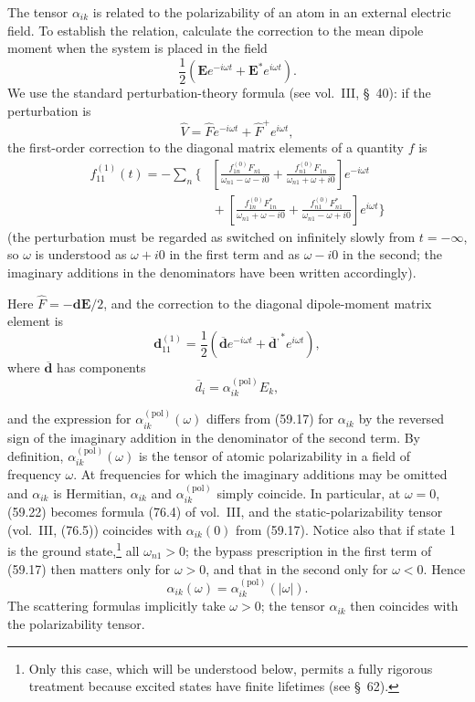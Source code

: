 The tensor $\alpha_{ik}$ is related to the polarizability of an atom in an external electric field. To establish the relation, calculate the correction to the mean dipole moment when the system is placed in the field
\begin{equation}
\frac12\left(\mathbf E e^{-i\omega t}+\mathbf E^*e^{i\omega t}\right).
\tag{59.20}
\end{equation}
We use the standard perturbation-theory formula (see vol.~III, \S~40): if the perturbation is
\[
\widehat V=\widehat F e^{-i\omega t}+\widehat F^+e^{i\omega t},
\]
the first-order correction to the diagonal matrix elements of a quantity $f$ is
\[
\begin{aligned}
f_{11}^{(1)}(t)=-\sum_n\Biggl\{&\left[
\frac{f_{1n}^{(0)}F_{n1}}{\omega_{n1}-\omega-i0}
+\frac{f_{n1}^{(0)}F_{1n}}{\omega_{n1}+\omega+i0}\right]e^{-i\omega t}\\
&{}+\left[
\frac{f_{1n}^{(0)}F_{1n}^*}{\omega_{n1}+\omega-i0}
+\frac{f_{n1}^{(0)}F_{n1}^*}{\omega_{n1}-\omega+i0}\right]e^{i\omega t}\Biggr\}
\end{aligned}
\]
(the perturbation must be regarded as switched on infinitely slowly from $t=-\infty$, so $\omega$ is understood as $\omega+i0$ in the first term and as $\omega-i0$ in the second; the imaginary additions in the denominators have been written accordingly).

Here $\widehat F=-\mathbf d\mathbf E/2$, and the correction to the diagonal dipole-moment matrix element is
\begin{equation}
\mathbf d_{11}^{(1)}=\frac12\left(\overline{\mathbf d}e^{-i\omega t}+\overline{\mathbf d}^{,*}e^{i\omega t}\right),
\tag{59.21}
\end{equation}
where $\overline{\mathbf d}$ has components
\begin{equation}
\overline d_i=\alpha_{ik}^{(\text{pol})}E_k,
\tag{59.22}
\end{equation}

and the expression for $\alpha_{ik}^{(\text{pol})}(\omega)$ differs from (59.17) for $\alpha_{ik}$ by the reversed sign of the imaginary addition in the denominator of the second term. By definition, $\alpha_{ik}^{(\text{pol})}(\omega)$ is the tensor of atomic polarizability in a field of frequency $\omega$. At frequencies for which the imaginary additions may be omitted and $\alpha_{ik}$ is Hermitian, $\alpha_{ik}$ and $\alpha_{ik}^{(\text{pol})}$ simply coincide. In particular, at $\omega=0$, (59.22) becomes formula (76.4) of vol.~III, and the static-polarizability tensor (vol.~III, (76.5)) coincides with $\alpha_{ik}(0)$ from (59.17). Notice also that if state 1 is the ground state,\footnote{Only this case, which will be understood below, permits a fully rigorous treatment because excited states have finite lifetimes (see \S~62).} all $\omega_{n1}>0$; the bypass prescription in the first term of (59.17) then matters only for $\omega>0$, and that in the second only for $\omega<0$. Hence
\begin{equation}
\alpha_{ik}(\omega)=\alpha_{ik}^{(\text{pol})}(|\omega|).
\tag{59.23}
\end{equation}
The scattering formulas implicitly take $\omega>0$; the tensor $\alpha_{ik}$ then coincides with the polarizability tensor.

